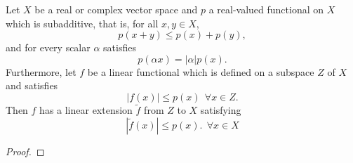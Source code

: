 \begin{theorem}
    Let \( X  \) be a real or complex vector space and \( p  \) a real-valued functional on \( X  \) which is subadditive, that is, for all \( x,y \in X  \),  
    \[  p(x+y) \leq p(x) + p(y), \tag{1} \]
    and for every scalar \( \alpha \) satisfies 
    \[  p(\alpha x ) = | \alpha |  p(x). \]
    Furthermore, let \( f  \) be a linear functional which is defined on a subspace \( Z  \) of \( X  \) and satisfies 
    \[  | f(x) |  \leq p(x) \ \ \forall x \in Z.  \]
    Then \( f  \) has a  linear extension \( \tilde{f} \) from \( Z  \) to \( X  \) satisfying 
    \[  | \tilde{f}(x) |  \leq p(x).  \ \  \forall x \in X  \]
\end{theorem}
\begin{proof}

\end{proof}
